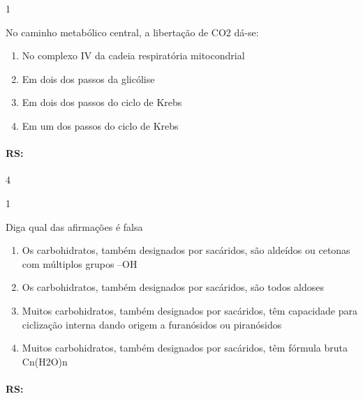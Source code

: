 \documentclass[\mainfilename]{subfiles}
\begin{document}
\begin{questionBox}1{}
    
    No caminho metabólico central, a libertação de CO2 dá-se:
    \begin{enumerate}
        \item No complexo IV da cadeia respiratória mitocondrial
        \item Em dois dos passos da glicólise 
        \item Em dois dos passos do ciclo de Krebs 
        \item Em um dos passos do ciclo de Krebs
    \end{enumerate}

    \paragraph{RS:} 4
    
\end{questionBox}

\begin{questionBox}1{}
    
    Diga qual das afirmações é {\color{red\Light}falsa}
    \begin{enumerate}
        \item Os  carbohidratos,  também designados por sacáridos, são aldeídos ou cetonas com múltiplos grupos –OH  
        \item Os  carbohidratos,  também designados por sacáridos, são todos aldoses 
        \item Muitos  carbohidratos,  também designados por sacáridos, têm capacidade para ciclização interna dando origem a furanósidos ou piranósidos 
        \item Muitos  carbohidratos,  também designados por sacáridos, têm fórmula bruta Cn(H2O)n
    \end{enumerate}

    \paragraph{RS:}
    
\end{questionBox}
\end{document}
